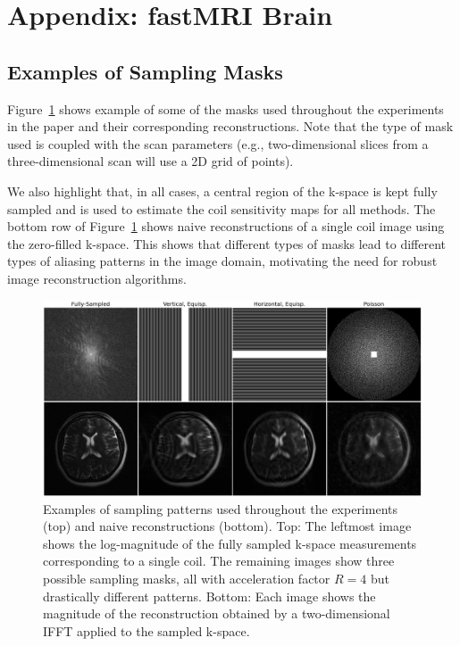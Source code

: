 \section{Appendix: fastMRI Brain}\label{app:brains}
\subsection{Examples of Sampling Masks}
Figure~\ref{fig:example_masks} shows example of some of the masks used throughout the experiments in the paper and their corresponding reconstructions. Note that the type of mask used is coupled with the scan parameters (e.g., two-dimensional slices from a three-dimensional scan will use a 2D grid of points).

We also highlight that, in all cases, a central region of the k-space is kept fully sampled and is used to estimate the coil sensitivity maps for all methods. The bottom row of Figure~\ref{fig:example_masks} shows naive reconstructions of a single coil image using the zero-filled k-space. This shows that different types of masks lead to different types of aliasing patterns in the image domain, motivating the need for robust image reconstruction algorithms.

\begin{figure}[t]
    \centering
    \includegraphics[width=\columnwidth]{paper_masks_crop.png}
    \caption{\small Examples of sampling patterns used throughout the experiments (top) and naive reconstructions (bottom). Top: The leftmost image shows the log-magnitude of the fully sampled k-space measurements corresponding to a single coil. The remaining images show three possible sampling masks, all with acceleration factor $R=4$ but drastically different patterns. Bottom: Each image shows the magnitude of the reconstruction obtained by a two-dimensional IFFT applied to the sampled k-space.}
    \label{fig:example_masks}
\end{figure}


